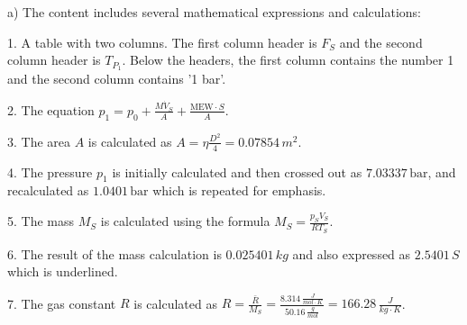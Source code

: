 a) The content includes several mathematical expressions and calculations:

1. A table with two columns. The first column header is \( F_S \) and the second column header is \( T_{P_1} \). Below the headers, the first column contains the number 1 and the second column contains '1 bar'.

2. The equation \( p_1 = p_0 + \frac{M \dot{V}_S}{A} + \frac{\text{MEW} \cdot S}{A} \).

3. The area \( A \) is calculated as \( A = \eta \frac{D^2}{4} = 0.07854 \, m^2 \).

4. The pressure \( p_1 \) is initially calculated and then crossed out as \( 7.03337 \, \text{bar} \), and recalculated as \( 1.0401 \, \text{bar} \) which is repeated for emphasis.

5. The mass \( M_S \) is calculated using the formula \( M_S = \frac{p_S V_S}{R T_S} \).

6. The result of the mass calculation is \( 0.025401 \, kg \) and also expressed as \( 2.5401 \, S \) which is underlined.

7. The gas constant \( R \) is calculated as \( R = \frac{\bar{R}}{M_S} = \frac{8.314 \, \frac{J}{mol \cdot K}}{50.16 \, \frac{g}{mol}} = 166.28 \, \frac{J}{kg \cdot K} \).